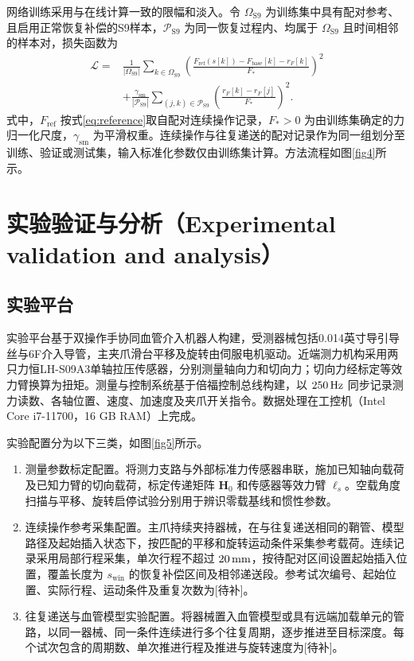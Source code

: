 \documentclass{JQR_LaTeX_Template-0507/JQRnew}
\providecommand{\RevisionColor}{\color{black}}
\newcommand{\revbegin}{\begingroup\RevisionColor}
\newcommand{\revend}{\par\endgroup}
\begin{document}
网络训练采用与在线计算一致的限幅和淡入。令 $\Omega_{\mathrm{S9}}$ 为训练集中具有配对参考、且启用正常恢复补偿的S9样本，$\mathcal P_{\mathrm{S9}}$ 为同一恢复过程内、均属于 $\Omega_{\mathrm{S9}}$ 且时间相邻的样本对，损失函数为
\begin{equation}
\label{eq:gru-loss}
\begin{aligned}
\mathcal L={}&\frac{1}{|\Omega_{\mathrm{S9}}|}\sum_{k\in\Omega_{\mathrm{S9}}}
\left(\frac{F_{\mathrm{ref}}(s[k])-F_{\mathrm{base}}[k]-r_F[k]}{F_*}\right)^2\\
&+\frac{\gamma_{\mathrm{sm}}}{|\mathcal P_{\mathrm{S9}}|}
\sum_{(j,k)\in\mathcal P_{\mathrm{S9}}}
\left(\frac{r_F[k]-r_F[j]}{F_*}\right)^2.
\end{aligned}
\end{equation}
式中，$F_{\mathrm{ref}}$ 按式\eqref{eq:reference}取自配对连续操作记录，$F_*>0$ 为由训练集确定的力归一化尺度，$\gamma_{\mathrm{sm}}$ 为平滑权重。连续操作与往复递送的配对记录作为同一组划分至训练、验证或测试集，输入标准化参数仅由训练集计算。方法流程如图\ref{fig4}所示。



\section{实验验证与分析（Experimental validation and analysis）}

\subsection{实验平台}

\revbegin
实验平台基于双操作手协同血管介入机器人构建，受测器械包括0.014英寸导引导丝与6F介入导管，主夹爪滑台平移及旋转由伺服电机驱动。近端测力机构采用两只力恒LH-S09A3单轴拉压传感器，分别测量轴向力和切向力；切向力经标定等效力臂换算为扭矩。测量与控制系统基于倍福控制总线构建，以 $250\,{\rm Hz}$ 同步记录测力读数、各轴位置、速度、加速度及夹爪开关指令。数据处理在工控机（Intel Core i7-11700，16 GB RAM）上完成。
\revend

实验配置分为以下三类，如图\ref{fig5}所示。
\begin{enumerate}[label=\arabic*),nosep,itemsep=0pt,topsep=2pt,partopsep=0pt,parsep=0pt,leftmargin=2\ccwd]
\item 测量参数标定配置。将测力支路与外部标准力传感器串联，施加已知轴向载荷及已知力臂的切向载荷，标定传递矩阵 $\bm H_0$ 和传感器等效力臂 $\ell_s$。空载角度扫描与平移、旋转启停试验分别用于辨识零载基线和惯性参数。
\item 连续操作参考采集配置。主爪持续夹持器械，在与往复递送相同的鞘管、模型路径及起始插入状态下，按匹配的平移和旋转运动条件采集参考载荷。连续记录采用局部行程采集，单次行程不超过 $20\,{\rm mm}$，按待配对区间设置起始插入位置，覆盖长度为 $s_{\mathrm{win}}$ 的恢复补偿区间及相邻递送段。参考试次编号、起始位置、实际行程、运动条件及重复次数为[待补]。
\item 往复递送与血管模型实验配置。将器械置入血管模型或具有远端加载单元的管路，以同一器械、同一条件连续进行多个往复周期，逐步推进至目标深度。每个试次包含的周期数、单次推进行程及推进与旋转速度为[待补]。
\end{enumerate}
\end{document}
